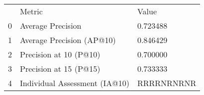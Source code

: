 \begin{tabular}{lll}
 & Metric & Value \\
0 & Average Precision & 0.723488 \\
1 & Average Precision (AP@10) & 0.846429 \\
2 & Precision at 10 (P@10) & 0.700000 \\
3 & Precision at 15 (P@15) & 0.733333 \\
4 & Individual Assessment (IA@10) & RRRRNRNRNR \\
\end{tabular}
